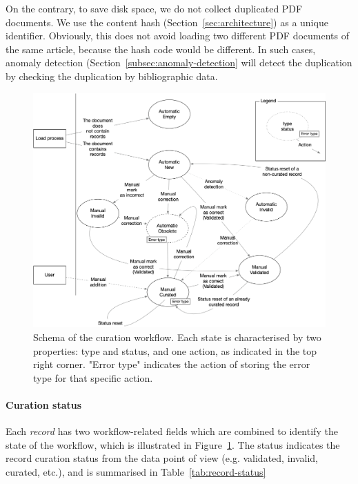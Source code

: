 \documentclass[a4paper]{article}
\begin{document}
On the contrary, to save disk space, we do not collect duplicated PDF documents. We use the content hash (Section~\ref{sec:architecture}) as a unique identifier.
Obviously, this does not avoid loading two different PDF documents of the same article, because the hash code would be different. In such cases, anomaly detection (Section~\ref{subsec:anomaly-detection} will detect the duplication by checking the duplication by bibliographic data. 


\begin{figure}[ht]
  \centering
  \includegraphics[width=1\textwidth]{images/record-correction} 
  \caption{Schema of the curation workflow. Each state is characterised by two properties: type and status, and one action, as indicated in the top right corner. "Error type" indicates the action of storing the error type for that specific action.}
  \label{fig:curation-workflow}
\end{figure}

\paragraph{Curation status} Each \textit{record} has two workflow-related fields which are combined to identify the state of the workflow, which is illustrated in Figure~\ref{fig:curation-workflow}. 
The status indicates the record curation status from the data point of view (e.g. validated, invalid, curated, etc.), and is summarised in Table~\ref{tab:record-status}
\end{document}

